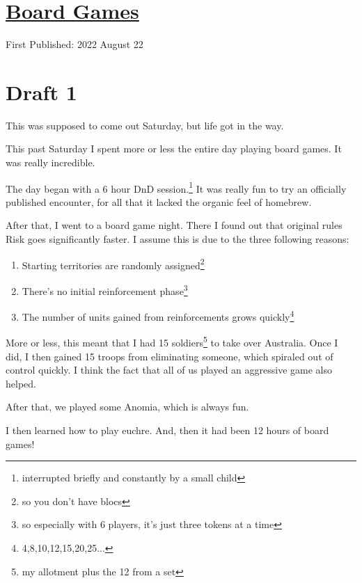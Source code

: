 \documentclass[12pt]{article}[titlepage]
\newcommand{\1}{\={a}}
\newcommand{\2}{\={e}}
\newcommand{\3}{\={\i}}
\newcommand{\4}{\=o}
\newcommand{\5}{\=u}
\newcommand{\6}{\={A}}
\renewcommand{\,}{\textsuperscript{,}}
\begin{document}
\doublespacing
\section{\href{board-games.html}{Board Games}}
First Published: 2022 August 22
\section{Draft 1}
This was supposed to come out Saturday, but life got in the way.

This past Saturday I spent more or less the entire day playing board games.
It was really incredible.

The day began with a 6 hour DnD session.\footnote{interrupted briefly and constantly by a small child}
It was really fun to try an officially published encounter, for all that it lacked the organic feel of homebrew.

After that, I went to a board game night.
There I found out that original rules Risk goes significantly faster.
I assume this is due to the three following reasons:
\begin{enumerate}
\item Starting territories are randomly assigned\footnote{so you don't have blocs}
\item There's no initial reinforcement phase\footnote{so especially with 6 players, it's just three tokens at a time}
\item The number of units gained from reinforcements grows quickly\footnote{4,8,10,12,15,20,25...}
\end{enumerate}
More or less, this meant that I had 15 soldiers\footnote{my allotment plus the 12 from a set} to take over Australia.
Once I did, I then gained 15 troops from eliminating someone, which spiraled out of control quickly.
I think the fact that all of us played an aggressive game also helped.

After that, we played some Anomia, which is always fun.

I then learned how to play euchre.
And, then it had been 12 hours of board games!
\end{document}

